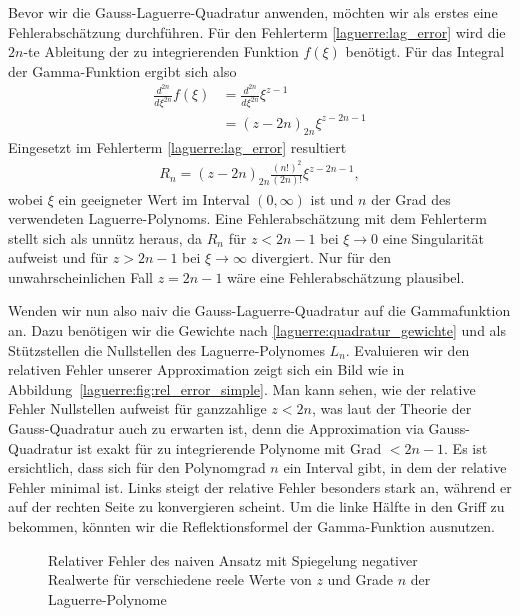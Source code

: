 Bevor wir die Gauss-Laguerre-Quadratur anwenden,
möchten wir als erstes eine Fehlerabschätzung durchführen.
Für den Fehlerterm \eqref{laguerre:lag_error} wird die $2n$-te Ableitung
der zu integrierenden Funktion $f(\xi)$ benötigt.
Für das Integral der Gamma-Funktion ergibt sich also
\begin{align*}
\frac{d^{2n}}{d\xi^{2n}} f(\xi)
 & =
\frac{d^{2n}}{d\xi^{2n}} \xi^{z-1}
\\
 & =
(z - 2n)_{2n} \xi^{z - 2n - 1}
\end{align*}
Eingesetzt im Fehlerterm \eqref{laguerre:lag_error} resultiert
\begin{align}
R_n
=
(z - 2n)_{2n} \frac{(n!)^2}{(2n)!} \xi^{z-2n-1}
,
\label{laguerre:gamma_err_simple}
\end{align}
wobei $\xi$ ein geeigneter Wert im Interval $(0, \infty)$ ist
und $n$ der Grad des verwendeten Laguerre-Polynoms.
Eine Fehlerabschätzung mit dem Fehlerterm stellt sich als unnütz heraus,
da $R_n$ für $z < 2n - 1$ bei $\xi \rightarrow 0$ eine Singularität aufweist
und für $z > 2n - 1$ bei $\xi \rightarrow \infty$ divergiert.
Nur für den unwahrscheinlichen Fall $ z = 2n - 1$
wäre eine Fehlerabschätzung plausibel.

Wenden wir nun also naiv die Gauss-Laguerre-Quadratur auf die Gammafunktion an.
Dazu benötigen wir die Gewichte nach
\eqref{laguerre:quadratur_gewichte}
und als Stützstellen die Nullstellen des Laguerre-Polynomes $L_n$.
Evaluieren wir den relativen Fehler unserer Approximation zeigt sich ein
Bild wie in Abbildung~\ref{laguerre:fig:rel_error_simple}.
Man kann sehen,
wie der relative Fehler Nullstellen aufweist für ganzzahlige $z < 2n$,
was laut der Theorie der Gauss-Quadratur auch zu erwarten ist,
denn die Approximation via Gauss-Quadratur
ist exakt für zu integrierende Polynome mit Grad $< 2n-1$.
Es ist ersichtlich,
dass sich für den Polynomgrad $n$ ein Interval gibt,
in dem der relative Fehler minimal ist.
Links steigt der relative Fehler besonders stark an,
während er auf der rechten Seite zu konvergieren scheint.
Um die linke Hälfte in den Griff zu bekommen,
könnten wir die Reflektionsformel der Gamma-Funktion ausnutzen.

\begin{figure}
\centering

\vspace{-12pt}
\caption{Relativer Fehler des naiven Ansatz mit Spiegelung negativer Realwerte
für verschiedene reele Werte von $z$ und Grade $n$ der Laguerre-Polynome}
\label{laguerre:fig:rel_error_mirror}
\end{figure}

